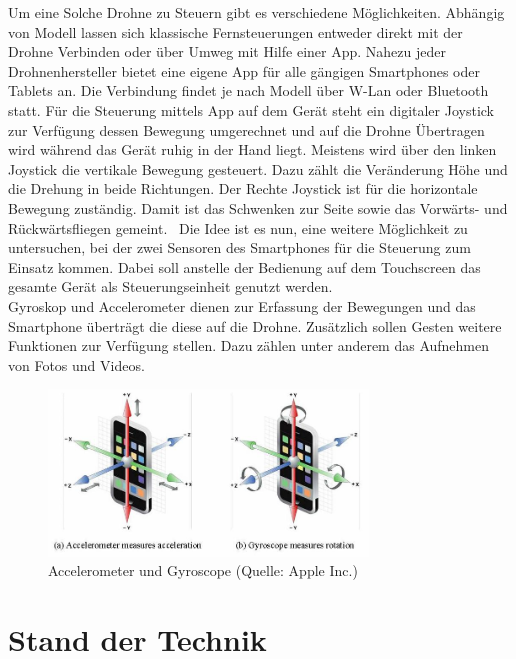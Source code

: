 \documentclass{article}
\begin{document}
Um eine Solche Drohne zu Steuern gibt es verschiedene Möglichkeiten. Abhängig von Modell lassen sich klassische Fernsteuerungen entweder direkt mit der Drohne Verbinden oder über Umweg mit Hilfe einer App. Nahezu jeder Drohnenhersteller bietet eine eigene App für alle gängigen Smartphones oder Tablets an. Die Verbindung findet je nach Modell über W-Lan oder Bluetooth statt. Für die Steuerung mittels App auf dem Gerät steht ein digitaler Joystick zur Verfügung dessen Bewegung umgerechnet und auf die Drohne Übertragen wird während das Gerät ruhig in der Hand liegt. Meistens wird über den linken Joystick die vertikale Bewegung gesteuert. Dazu zählt die Veränderung Höhe und die Drehung in beide Richtungen. Der Rechte Joystick ist für die horizontale Bewegung zuständig. Damit ist das Schwenken zur Seite sowie das Vorwärts- und Rückwärtsfliegen gemeint. 
\ Die Idee ist es nun, eine weitere Möglichkeit zu untersuchen, bei der zwei Sensoren des Smartphones für die Steuerung zum Einsatz kommen. Dabei soll anstelle der Bedienung auf dem Touchscreen das gesamte Gerät als Steuerungseinheit genutzt werden. \\Gyroskop und Accelerometer dienen zur Erfassung der Bewegungen und das Smartphone überträgt die diese auf die Drohne. Zusätzlich sollen Gesten weitere Funktionen zur Verfügung stellen. Dazu zählen unter anderem das Aufnehmen von Fotos und Videos.
\begin{figure}[htb]
\begin{minipage}[b]{1.0\linewidth}
  \centering
\centerline{\includegraphics[width= 85mm]{gyro.jpg}}
\end{minipage}
\caption{Accelerometer und Gyroscope (Quelle: Apple Inc.)}
\label{fig:gyro}
\end{figure}


\section{Stand der Technik}
\label{sec:verwandteArbeiten}
\end{document}
